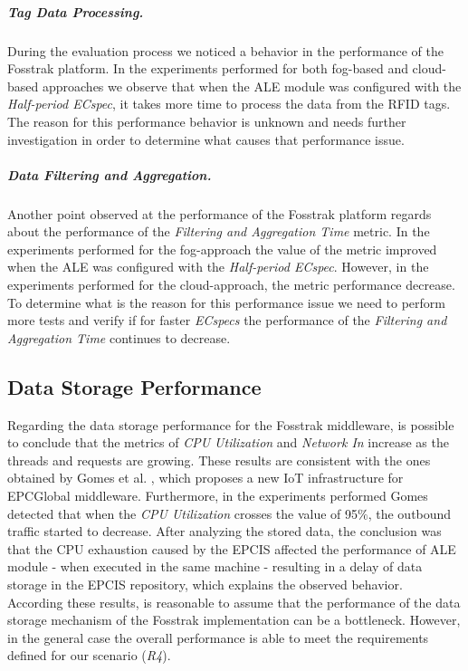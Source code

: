         \subparagraph{Tag Data Processing.}
        \label{subp:eval_tag_processing}
        During the evaluation process we noticed a behavior in the performance of the Fosstrak platform.
        In the experiments performed for both fog-based and cloud-based approaches we observe that when
        the \gls{ALE} module was configured with the \textit{Half-period ECspec}, it takes more time to
        process the data from the \gls{RFID} tags. The reason for this performance behavior is unknown and
        needs further investigation in order to determine what causes that performance issue.

        \subparagraph{Data Filtering and Aggregation.}
        \label{subp:data_filtering_aggregation}
        Another point observed at the performance of the Fosstrak platform regards about the performance
        of the \textit{Filtering and Aggregation Time} metric. In the experiments performed for the
        fog-approach the value of the metric improved when the \gls{ALE} was configured with the
        \textit{Half-period ECspec}. However, in the experiments performed for the cloud-approach, the
        metric performance decrease. To determine what is the reason for this performance issue we need
        to perform more tests and verify if for faster \textit{ECspecs} the performance of the
        \textit{Filtering and Aggregation Time} continues to decrease.

        \subsection{Data Storage Performance}
        \label{subs:eval_results_data}
        Regarding the data storage performance for the Fosstrak middleware, is possible to conclude that the metrics
        of \textit{CPU Utilization} and \textit{Network In} increase as the threads and requests are growing.
        These results are consistent with the ones obtained by Gomes et al. \cite{gomes2014future}, which
        proposes a new \gls{IoT} infrastructure for \gls{EPC}Global middleware. Furthermore, in the experiments
        performed Gomes detected that when the \textit{CPU Utilization} crosses the value of 95$\%$, the
        outbound traffic started to decrease. After analyzing the stored data, the conclusion was that the
        \gls{CPU} exhaustion caused by the \gls{EPCIS} affected the performance of \gls{ALE} module - when
        executed in the same machine - resulting in a delay of data storage in the \gls{EPCIS} repository,
        which explains the observed behavior.\\

        According these results, is reasonable to assume that the performance of the data storage mechanism of
        the Fosstrak implementation can be a bottleneck. However, in the general case the overall performance
        is able to meet the requirements defined for our scenario (\textit{R4}).
